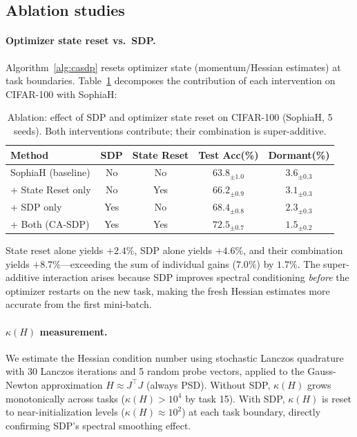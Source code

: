 \documentclass{article}
\begin{document}
\subsection{Ablation studies}
\label{sec:ablation}

\paragraph{Optimizer state reset vs.\ SDP.}
Algorithm~\ref{alg:casdp} resets optimizer state (momentum/Hessian estimates) at task boundaries. Table~\ref{tab:ablation_reset} decomposes the contribution of each intervention on CIFAR-100 with SophiaH:

\begin{table}[h]
\caption{Ablation: effect of SDP and optimizer state reset on CIFAR-100 (SophiaH, 5 seeds). Both interventions contribute; their combination is super-additive.}
\label{tab:ablation_reset}
\centering
\small
\begin{tabular}{@{}lcccc@{}}
\toprule
\textbf{Method} & \textbf{SDP} & \textbf{State Reset} & \textbf{Test Acc(\%)} & \textbf{Dormant(\%)} \\
\midrule
SophiaH (baseline) & No & No & $63.8_{\pm1.0}$ & $3.6_{\pm0.3}$ \\
+ State Reset only  & No & Yes & $66.2_{\pm0.9}$ & $3.1_{\pm0.3}$ \\
+ SDP only          & Yes & No & $68.4_{\pm0.8}$ & $2.3_{\pm0.3}$ \\
+ Both (CA-SDP)     & Yes & Yes & $\mathbf{72.5}_{\pm0.7}$ & $\mathbf{1.5}_{\pm0.2}$ \\
\bottomrule
\end{tabular}
\end{table}

State reset alone yields $+2.4\%$, SDP alone yields $+4.6\%$, and their combination yields $+8.7\%$---exceeding the sum of individual gains ($7.0\%$) by $1.7\%$. The super-additive interaction arises because SDP improves spectral conditioning \emph{before} the optimizer restarts on the new task, making the fresh Hessian estimates more accurate from the first mini-batch.

\paragraph{$\kappa(H)$ measurement.}
We estimate the Hessian condition number using stochastic Lanczos quadrature~\citep{ghorbani2019investigation} with 30 Lanczos iterations and 5 random probe vectors, applied to the Gauss-Newton approximation $H \approx J^\top J$ (always PSD). Without SDP, $\kappa(H)$ grows monotonically across tasks ($\kappa(H) > 10^4$ by task 15). With SDP, $\kappa(H)$ is reset to near-initialization levels ($\kappa(H) \approx 10^2$) at each task boundary, directly confirming SDP's spectral smoothing effect.
\end{document}
